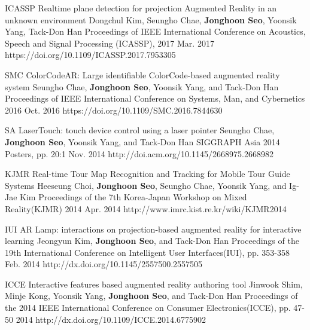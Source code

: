 \begin{cventries}
  \cvpublicationentry
    {ICASSP} %
    {Realtime plane detection for projection Augmented Reality in an unknown environment} %
    {Dongchul Kim, Seungho Chae, \textbf{Jonghoon Seo}, Yoonsik Yang, Tack-Don Han} %
    {Proceedings of IEEE International Conference on Acoustics, Speech and Signal Processing (ICASSP), 2017}
    {Mar. 2017} %
    {https://doi.org/10.1109/ICASSP.2017.7953305}

  \cvpublicationentry
    {SMC} %
    {ColorCodeAR: Large identifiable ColorCode-based augmented reality system} %
    {Seungho Chae, \textbf{Jonghoon Seo}, Yoonsik Yang, and Tack-Don Han} %
    {Proceedings of IEEE International Conference on Systems, Man, and Cybernetics 2016}
    {Oct. 2016} %
    {https://doi.org/10.1109/SMC.2016.7844630}

  \cvpublicationentry
    {SA} %
    {LaserTouch: touch device control using a laser pointer} %
    {Seungho Chae, \textbf{Jonghoon Seo}, Yoonsik Yang, and Tack-Don Han} %
    {SIGGRAPH Asia 2014 Posters, pp. 20:1}
    {Nov. 2014} %
    {http://doi.acm.org/10.1145/2668975.2668982}

  \cvpublicationentry
    {KJMR} %
    {Real-time Tour Map Recognition and Tracking for Mobile Tour Guide Systems} %
    {Heeseung Choi, \textbf{Jonghoon Seo}, Seungho Chae, Yoonsik Yang, and Ig-Jae Kim} %
    {Proceedings of the 7th Korea-Japan Workshop on Mixed Reality(KJMR) 2014}
    {Apr. 2014} %
    {http://www.imrc.kist.re.kr/wiki/KJMR2014}

  \cvpublicationentry
    {IUI} %
    {AR Lamp: interactions on projection-based augmented reality for interactive learning} %
    {Jeongyun Kim, \textbf{Jonghoon Seo}, and Tack-Don Han} %
    {Proceedings of the 19th International Conference on Intelligent User Interfaces(IUI), pp. 353-358}
    {Feb. 2014} %
    {http://dx.doi.org/10.1145/2557500.2557505}

  \cvpublicationentry
    {ICCE} %
    {Interactive features based augmented reality authoring tool} %
    {Jinwook Shim, Minje Kong, Yoonsik Yang, \textbf{Jonghoon Seo}, and Tack-Don Han} %
    {Proceedings of the 2014 IEEE International Conference on Consumer Electronics(ICCE), pp. 47-50}
    {2014} %
    {http://dx.doi.org/10.1109/ICCE.2014.6775902}


\end{cventries}
